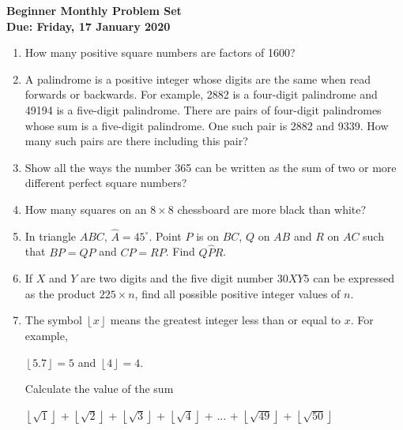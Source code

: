 \documentclass{article}
\begin{document}
\begin{center}
	\textbf{\Large Beginner Monthly Problem Set}
	\\ \vspace{1em}
	\textbf{\large Due: Friday, 17 January 2020}
\end{center}

\begin{enumerate}[1.]

\vspace{6pt}
\item %
How many positive square numbers are factors of 1600?

\vspace{6pt}
\item %
A palindrome is a positive integer whose digits are the same when read forwards or backwards.
For example, 2882 is a four-digit palindrome and 49194 is a five-digit palindrome. There are
pairs of four-digit palindromes whose sum is a five-digit palindrome. One such pair is 2882
and 9339. How many such pairs are there including this pair?

\vspace{6pt}
\item %
Show all the ways the number 365 can be written as the sum of two or more different perfect
square numbers?

\vspace{6pt}
\item %
How many squares on an $8 \times 8$ chessboard are more black than white?

\vspace{6pt}
\item %
In triangle $ABC$, $\widehat{A} = 45^{\circ}$. Point $P$ is on $BC$, $Q$ on $AB$ and $R$ on $AC$ such that $BP = QP$ and $CP = RP$. Find $Q \widehat{P} R$.

\vspace{6pt}
\item %
If $X$ and $Y$ are two digits and the five digit number $30XY5$ can be expressed as the product $225 \times n$, find all possible positive integer values of $n$.

\vspace{6pt}
\item %
The symbol $\left \lfloor{x}\right \rfloor$ means the greatest integer less than or equal to $x$. For example, 
\begin{center}
	$\left \lfloor{5.7}\right \rfloor = 5$ and $\left \lfloor{4}\right \rfloor = 4$.
\end{center} 
Calculate the value of the sum
\begin{center}
	$\left \lfloor{\sqrt{1}}\right \rfloor$ + $\left \lfloor{\sqrt{2}}\right \rfloor$ + $\left \lfloor{\sqrt{3}}\right \rfloor$ + $\left \lfloor{\sqrt{4}}\right \rfloor$ + ... + $\left \lfloor{\sqrt{49}}\right \rfloor$ + $\left \lfloor{\sqrt{50}}\right \rfloor$
\end{center}


\end{enumerate}
\end{document}
